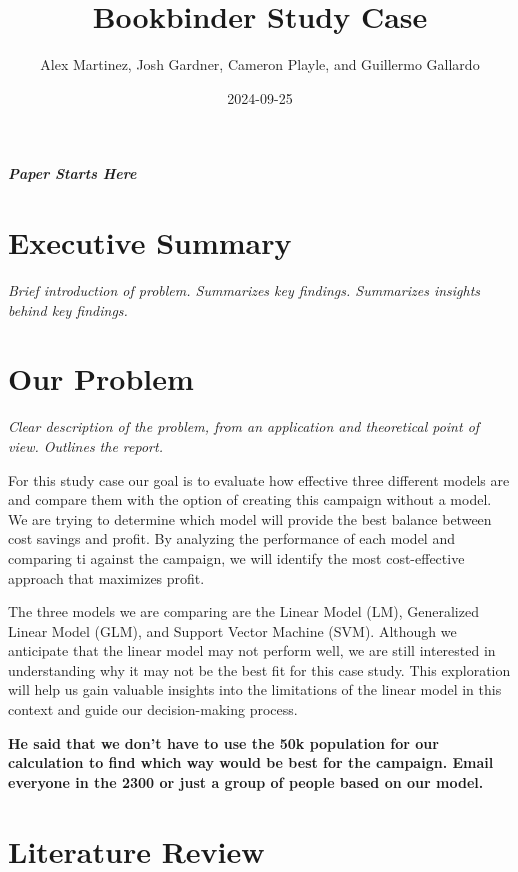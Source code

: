 \documentclass[
]{article}
\title{Bookbinder Study Case}
\author{Alex Martinez, Josh Gardner, Cameron Playle, and Guillermo
Gallardo}
\date{2024-09-25}
\begin{document}
\maketitle

\hypertarget{paper-starts-here}{%
\subparagraph{\texorpdfstring{\textbf{Paper Starts
Here}}{Paper Starts Here}}\label{paper-starts-here}}

\hypertarget{executive-summary}{%
\section{Executive Summary}\label{executive-summary}}

\emph{Brief introduction of problem. Summarizes key findings. Summarizes
insights behind key findings.}

\hypertarget{our-problem}{%
\section{Our Problem}\label{our-problem}}

\emph{Clear description of the problem, from an application and
theoretical point of view. Outlines the report.}

For this study case our goal is to evaluate how effective three
different models are and compare them with the option of creating this
campaign without a model. We are trying to determine which model will
provide the best balance between cost savings and profit. By analyzing
the performance of each model and comparing ti against the campaign, we
will identify the most cost-effective approach that maximizes profit.

The three models we are comparing are the Linear Model (LM), Generalized
Linear Model (GLM), and Support Vector Machine (SVM). Although we
anticipate that the linear model may not perform well, we are still
interested in understanding why it may not be the best fit for this case
study. This exploration will help us gain valuable insights into the
limitations of the linear model in this context and guide our
decision-making process.

\textbf{He said that we don't have to use the 50k population for our
calculation to find which way would be best for the campaign. Email
everyone in the 2300 or just a group of people based on our model.}

\hypertarget{literature-review}{%
\section{Literature Review}\label{literature-review}}
\end{document}
